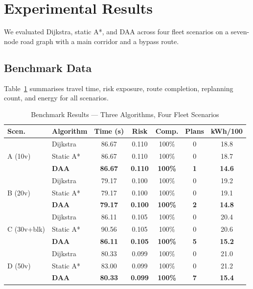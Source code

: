 \documentclass[conference]{IEEEtran}
\begin{document}
\section{Experimental Results}
\label{sec:results}

We evaluated Dijkstra, static A*, and DAA across four fleet scenarios
on a seven-node road graph with a main corridor and a bypass route.

\subsection{Benchmark Data}

Table~\ref{tab:benchmark} summarises travel time, risk exposure, route
completion, replanning count, and energy for all scenarios.

\begin{table}[t]
\caption{Benchmark Results --- Three Algorithms, Four Fleet Scenarios}
\label{tab:benchmark}
\centering
\setlength{\tabcolsep}{3pt}
\begin{tabular}{@{}llccccc@{}}
\toprule
\textbf{Scen.} & \textbf{Algorithm} &
\textbf{Time (s)} & \textbf{Risk} & \textbf{Comp.} &
\textbf{Plans} & \textbf{kWh/100} \\
\midrule
\multirow{3}{*}{A (10v)}
  & Dijkstra     & 86.67 & 0.110 & 100\% & 0 & 18.8 \\
  & Static A*    & 86.67 & 0.110 & 100\% & 0 & 18.7 \\
  & \textbf{DAA} & \textbf{86.67} & \textbf{0.110} & \textbf{100\%} & \textbf{1} & \textbf{14.6} \\
\midrule
\multirow{3}{*}{B (20v)}
  & Dijkstra     & 79.17 & 0.100 & 100\% & 0 & 19.2 \\
  & Static A*    & 79.17 & 0.100 & 100\% & 0 & 19.1 \\
  & \textbf{DAA} & \textbf{79.17} & \textbf{0.100} & \textbf{100\%} & \textbf{2} & \textbf{14.8} \\
\midrule
\multirow{3}{*}{C (30v+blk)}
  & Dijkstra     & 86.11 & 0.105 & 100\% & 0 & 20.4 \\
  & Static A*    & 90.56 & 0.105 & 100\% & 0 & 20.6 \\
  & \textbf{DAA} & \textbf{86.11} & \textbf{0.105} & \textbf{100\%} & \textbf{5} & \textbf{15.2} \\
\midrule
\multirow{3}{*}{D (50v)}
  & Dijkstra     & 80.33 & 0.099 & 100\% & 0 & 21.0 \\
  & Static A*    & 83.00 & 0.099 & 100\% & 0 & 21.2 \\
  & \textbf{DAA} & \textbf{80.33} & \textbf{0.099} & \textbf{100\%} & \textbf{7} & \textbf{15.4} \\
\bottomrule
\end{tabular}
\end{table}
\end{document}
